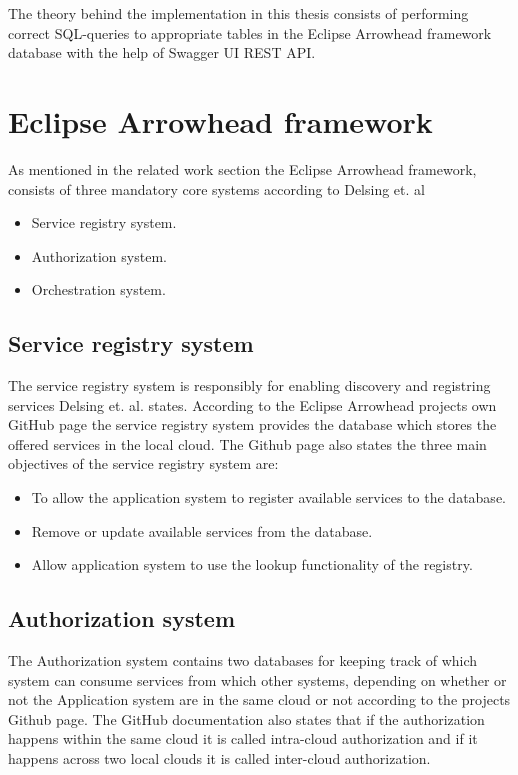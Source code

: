The theory behind the implementation in this thesis consists of performing correct SQL-queries to appropriate tables in the Eclipse Arrowhead framework database with the help of Swagger UI REST API.
\section{Eclipse Arrowhead framework} 

As mentioned in the related work section the Eclipse Arrowhead framework, consists of three mandatory core systems according to Delsing et. al
\begin{itemize}
    \item Service registry system.
    \item Authorization system. 
    \item Orchestration system.\cite{Delsing2017}
\end{itemize} 
\subsection{Service registry system}
The service registry system is responsibly for enabling discovery and registring services Delsing et. al. states. 
According to the Eclipse Arrowhead projects own GitHub page the service registry system provides the database which stores the offered services in the local cloud.\cite{Github2021}
The Github page also states the three main objectives of the service registry system are:
\begin{itemize}
    \item To allow the application system to register available services to the database. 
    \item Remove or update available services from the database.
    \item Allow application system to use the lookup functionality of the registry.
\end{itemize}
\subsection{Authorization system}
The Authorization system contains two databases for keeping track of which system can consume services from which other systems, depending on whether or not the Application system are in the same cloud or not according to the projects Github page.
The GitHub documentation also states that if the authorization happens within the same cloud it is called intra-cloud authorization and if it happens across two local clouds it is called inter-cloud authorization.\cite{Github2021}
